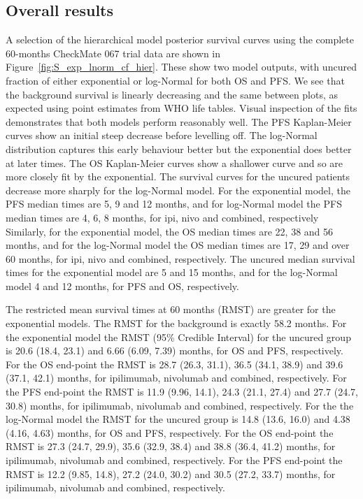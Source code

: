 \documentclass[AMA,STIX1COL]{WileyNJD-v2}
\begin{document}
\subsection{Overall results} \label{sec:results}
A selection of the hierarchical model posterior survival curves using the complete 60-months CheckMate 067 trial data are shown in Figure~\ref{fig:S_exp_lnorm_cf_hier}.
These show two model outputs, with uncured fraction of either exponential or log-Normal for both OS and PFS.
We see that the background survival is linearly decreasing and the same between plots, as expected using point estimates from WHO life tables.
Visual inspection of the fits demonstrates that both models perform reasonably well.
The PFS Kaplan-Meier curves show an initial steep decrease before levelling off.
The log-Normal distribution captures this early behaviour better but the exponential does better at later times.
The OS Kaplan-Meier curves show a shallower curve and so are more closely fit by the exponential.
The survival curves for the uncured patients decrease more sharply for the log-Normal model.
For the exponential model, the PFS median times are 5, 9 and 12 months,
and for log-Normal model the PFS median times are 4, 6, 8 months, for ipi, nivo and combined, respectively
Similarly, for the exponential model, the OS median times are 22, 38 and 56 months,
and for the log-Normal model the OS median times are 17, 29 and over 60 months, for ipi, nivo and combined, respectively.
The uncured median survival times for the exponential model are 5 and 15 months, and for the log-Normal model 4 and 12 months, for PFS and OS, respectively.

The restricted mean survival times at 60 months (RMST) are greater for the exponential models.
The RMST for the background is exactly 58.2 months.
For the exponential model the RMST (95\% Credible Interval) for the uncured group is 20.6 (18.4, 23.1) and 6.66 (6.09, 7.39) months, for OS and PFS, respectively. 
For the OS end-point the RMST is 28.7 (26.3, 31.1), 36.5 (34.1, 38.9) and 39.6 (37.1, 42.1) months, for ipilimumab, nivolumab and combined, respectively.
For the PFS end-point the RMST is 11.9 (9.96, 14.1), 24.3 (21.1, 27.4) and 27.7 (24.7, 30.8) months, for ipilimumab, nivolumab and combined, respectively.
For the the log-Normal model the RMST for the uncured group is 14.8 (13.6, 16.0) and 4.38 (4.16, 4.63) months, for OS and PFS, respectively. 
For the OS end-point the RMST is 27.3 (24.7, 29.9), 35.6 (32.9, 38.4) and 38.8 (36.4, 41.2) months, for ipilimumab, nivolumab and combined, respectively.
For the PFS end-point the RMST is 12.2 (9.85, 14.8), 27.2 (24.0, 30.2) and 30.5 (27.2, 33.7) months, for ipilimumab, nivolumab and combined, respectively.
\end{document}
